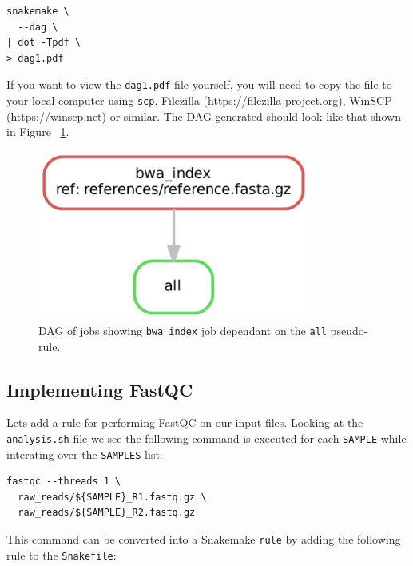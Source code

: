 \begin{lstlisting}
snakemake \
  --dag \
| dot -Tpdf \
> dag1.pdf
\end{lstlisting}

\begin{warning}

If you want to view the \texttt{dag1.pdf} file yourself, you will need to copy the file to your local computer using \texttt{scp}, Filezilla (\url{https://filezilla-project.org}), WinSCP (\url{https://winscp.net}) or similar.
The DAG generated should look like that shown in Figure ~\ref{fig:dag1}.

\end{warning}

\begin{figure}[H]
\centering
\includegraphics[width=0.8\textwidth]{handout/dag1.pdf}
\caption{DAG of jobs showing \texttt{bwa\_index} job dependant on the \texttt{all} pseudo-rule.}
\label{fig:dag1}
\end{figure}

\newpage
\subsection{Implementing FastQC}

Lets add a rule for performing FastQC on our input files.
Looking at the \texttt{analysis.sh} file we see the following command is executed for each \texttt{SAMPLE} while interating over the \texttt{SAMPLES} list:

\begin{lstlisting}
fastqc --threads 1 \
  raw_reads/${SAMPLE}_R1.fastq.gz \
  raw_reads/${SAMPLE}_R2.fastq.gz
\end{lstlisting}

This command can be converted into a Snakemake \texttt{rule} by adding the following rule to the \texttt{Snakefile}:

